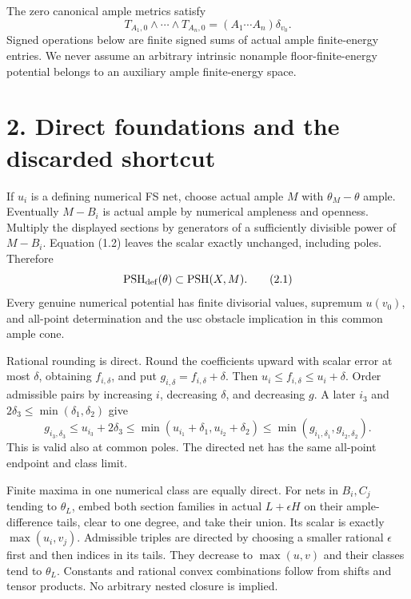 \documentclass[
  10pt,
]{article}
\begin{document}
The zero canonical ample metrics satisfy
\[T_{A_1,0}\wedge\cdots\wedge T_{A_n,0}
=(A_1\cdots A_n)\delta_{v_0}. \tag{1.5}\] Signed operations below are
finite signed sums of actual ample finite-energy entries. We never
assume an arbitrary intrinsic nonample floor-finite-energy potential
belongs to an auxiliary ample finite-energy space.

\section{2. Direct foundations and the discarded
shortcut}\label{direct-foundations-and-the-discarded-shortcut}

If \(u_i\) is a defining numerical FS net, choose actual ample \(M\)
with \(\theta_M-\theta\) ample. Eventually \(M-B_i\) is actual ample by
numerical ampleness and openness. Multiply the displayed sections by
generators of a sufficiently divisible power of \(M-B_i\). Equation
(1.2) leaves the scalar exactly unchanged, including poles. Therefore
\[\operatorname{PSH}_{\rm def}(\theta)\subset\operatorname{PSH}(X,M). \tag{2.1}\]
Every genuine numerical potential has finite divisorial values, supremum
\(u(v_0)\), and all-point determination and the usc obstacle implication
in this common ample cone.

Rational rounding is direct. Round the coefficients upward with scalar
error at most \(\delta\), obtaining \(f_{i,\delta}\), and put
\(g_{i,\delta}=f_{i,\delta}+\delta\). Then
\(u_i\le f_{i,\delta}\le u_i+\delta\). Order admissible pairs by
increasing \(i\), decreasing \(\delta\), and decreasing \(g\). A later
\(i_3\) and \(2\delta_3\le\min(\delta_1,\delta_2)\) give
\[g_{i_3,\delta_3}\le u_{i_3}+2\delta_3
\le\min(u_{i_1}+\delta_1,u_{i_2}+\delta_2)
\le\min(g_{i_1,\delta_1},g_{i_2,\delta_2}).\] This is valid also at
common poles. The directed net has the same all-point endpoint and class
limit.

Finite maxima in one numerical class are equally direct. For nets in
\(B_i,C_j\) tending to \(\theta_L\), embed both section families in
actual \(L+\epsilon H\) on their ample-difference tails, clear to one
degree, and take their union. Its scalar is exactly \(\max(u_i,v_j)\).
Admissible triples are directed by choosing a smaller rational
\(\epsilon\) first and then indices in its tails. They decrease to
\(\max(u,v)\) and their classes tend to \(\theta_L\). Constants and
rational convex combinations follow from shifts and tensor products. No
arbitrary nested closure is implied.
\end{document}
